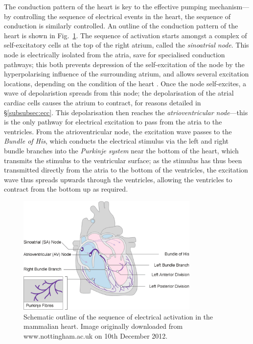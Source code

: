 \documentclass[../thesis-main.tex]{subfiles}
\begin{document}
The conduction pattern of the heart is key to the effective pumping mechanism---by controlling the sequence of electrical events in the heart, the sequence of conduction is similarly controlled. An outline of the conduction pattern of the heart is shown in Fig.~\ref{fig:conduction-pattern}. The sequence of activation starts amongst a complex of self-excitatory cells at the top of the right atrium, called the \emph{sinoatrial node}. This node is electrically isolated from the atria, save for specialised conduction pathways; this both prevents depression of the self-excitation of the node by the hyperpolarising influence of the surrounding atrium, and allows several excitation locations, depending on the condition of the heart \citep{Fedorov2012}. Once the node self-excites, a wave of depolaristion spreads from this node; the depolarisation of the atrial cardiac cells causes the atrium to contract, for reasons detailed in \S\ref{subsubsec:ecc}. This depolarisation then reaches the \emph{atrioventricular node}---this is the only pathway for electrical excitation to pass from the atria to the ventricles. From the atrioventricular node, the excitation wave passes to the \emph{Bundle of His}, which conducts the electrical stimulus via the left and right bundle branches into the \emph{Purkinje system} near the bottom of the heart, which transmits the stimulus to the ventricular surface; as the stimulus has thus been transmitted directly from the atria to the bottom of the ventricles, the excitation wave thus spreads upwards through the ventricles, allowing the ventricles to contract from the bottom up as required.
\begin{figure}
 \centering
 \includegraphics[width=0.8\textwidth]{cardiac_conduction}
 \caption[Pattern of electrical activation in the heart]{Schematic outline of the sequence of electrical activation in the mammalian heart. Image originally downloaded from www.nottingham.ac.uk on 10th December 2012.}
 \label{fig:conduction-pattern}
\end{figure}
\end{document}
